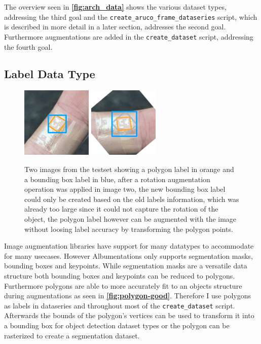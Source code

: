 \documentclass[10pt]{book}
\newcommand{\figureref}[1]{\textbf{\autoref{#1}}}
\begin{document}
The overview seen in \figureref{fig:arch_data} shows the various dataset types, addressing the third goal and the \texttt{create\_aruco\_frame\_dataseries} script, which is described in more detail in a later section, addresses the second goal. Furthermore augmentations are added in the \texttt{create\_dataset} script, addressing the fourth goal.

\subsection{Label Data Type}

\begin{figure}
  \centering
     {\includegraphics[width=0.3\textwidth]{image/polygon_pog_1}}
     {\includegraphics[width=0.3\textwidth]{image/polygon_pog_2}}
  \caption{Two images from the testset showing a polygon label in orange and a bounding box label in blue, after a rotation augmentation operation was applied in image two, the new bounding box label could only be created based on the old labels information, which was already too large since it could not capture the rotation of the object, the polygon label however can be augmented with the image without loosing label accuracy by transforming the polygon points.}
  \label{fig:polygon-good}
\end{figure}

Image augmentation libraries have support for many datatypes to accommodate for many usecases. However Albumentations only supports segmentation masks, bounding boxes and keypoints. While segmentation masks are a versatile data structure both bounding boxes and keypoints can be reduced to polygons. Furthermore polygons are able to more accurately fit to an objects structure during augmentations as seen in \figureref{fig:polygon-good}. Therefore I use polygons as labels in dataseries and throughout most of the \texttt{create\_dataset} script. Afterwards the bounds of the polygon's vertices can be used to transform it into a bounding box for object detection dataset types or the polygon can be rasterized to create a segmentation dataset.
\end{document}
